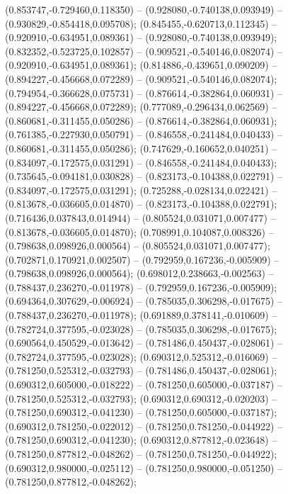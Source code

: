  (0.853747,-0.729460,0.118350) -- (0.928080,-0.740138,0.093949) -- (0.930829,-0.854418,0.095708);
 (0.845455,-0.620713,0.112345) -- (0.920910,-0.634951,0.089361) -- (0.928080,-0.740138,0.093949);
 (0.832352,-0.523725,0.102857) -- (0.909521,-0.540146,0.082074) -- (0.920910,-0.634951,0.089361);
 (0.814886,-0.439651,0.090209) -- (0.894227,-0.456668,0.072289) -- (0.909521,-0.540146,0.082074);
 (0.794954,-0.366628,0.075731) -- (0.876614,-0.382864,0.060931) -- (0.894227,-0.456668,0.072289);
 (0.777089,-0.296434,0.062569) -- (0.860681,-0.311455,0.050286) -- (0.876614,-0.382864,0.060931);
 (0.761385,-0.227930,0.050791) -- (0.846558,-0.241484,0.040433) -- (0.860681,-0.311455,0.050286);
 (0.747629,-0.160652,0.040251) -- (0.834097,-0.172575,0.031291) -- (0.846558,-0.241484,0.040433);
 (0.735645,-0.094181,0.030828) -- (0.823173,-0.104388,0.022791) -- (0.834097,-0.172575,0.031291);
 (0.725288,-0.028134,0.022421) -- (0.813678,-0.036605,0.014870) -- (0.823173,-0.104388,0.022791);
 (0.716436,0.037843,0.014944) -- (0.805524,0.031071,0.007477) -- (0.813678,-0.036605,0.014870);
 (0.708991,0.104087,0.008326) -- (0.798638,0.098926,0.000564) -- (0.805524,0.031071,0.007477);
 (0.702871,0.170921,0.002507) -- (0.792959,0.167236,-0.005909) -- (0.798638,0.098926,0.000564);
 (0.698012,0.238663,-0.002563) -- (0.788437,0.236270,-0.011978) -- (0.792959,0.167236,-0.005909);
 (0.694364,0.307629,-0.006924) -- (0.785035,0.306298,-0.017675) -- (0.788437,0.236270,-0.011978);
 (0.691889,0.378141,-0.010609) -- (0.782724,0.377595,-0.023028) -- (0.785035,0.306298,-0.017675);
 (0.690564,0.450529,-0.013642) -- (0.781486,0.450437,-0.028061) -- (0.782724,0.377595,-0.023028);
 (0.690312,0.525312,-0.016069) -- (0.781250,0.525312,-0.032793) -- (0.781486,0.450437,-0.028061);
 (0.690312,0.605000,-0.018222) -- (0.781250,0.605000,-0.037187) -- (0.781250,0.525312,-0.032793);
 (0.690312,0.690312,-0.020203) -- (0.781250,0.690312,-0.041230) -- (0.781250,0.605000,-0.037187);
 (0.690312,0.781250,-0.022012) -- (0.781250,0.781250,-0.044922) -- (0.781250,0.690312,-0.041230);
 (0.690312,0.877812,-0.023648) -- (0.781250,0.877812,-0.048262) -- (0.781250,0.781250,-0.044922);
 (0.690312,0.980000,-0.025112) -- (0.781250,0.980000,-0.051250) -- (0.781250,0.877812,-0.048262);
